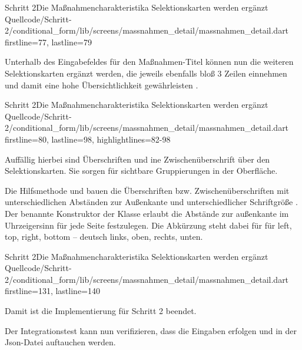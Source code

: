 \begin{alexlisting}{Schritt 2}{Die Maßnahmencharakteristika Selektionskarten werden ergänzt}
  {Quellcode/Schritt-2/conditional_form/lib/screens/massnahmen_detail/massnahmen_detail.dart}
  {firstline=77, lastline=79}
  \label{lst:Schritt2BuildSelectionCardLetzterStatusChoices}
\end{alexlisting}

Unterhalb des Eingabefeldes für den Maßnahmen-Titel können nun die weiteren Selektionskarten ergänzt werden, die jeweils ebenfalls bloß 3 Zeilen einnehmen und damit eine hohe Übersichtlichkeit gewährleisten .

\begin{alexlisting}{Schritt 2}{Die Maßnahmencharakteristika Selektionskarten werden ergänzt}
  {Quellcode/Schritt-2/conditional_form/lib/screens/massnahmen_detail/massnahmen_detail.dart}
  {firstline=80, lastline=98, highlightlines={82-98}}
  \label{lst:Schritt2MassnahmencharakteristikaSelektionskartenWerdenErgaenzt}
\end{alexlisting}

Auffällig hierbei sind Überschriften  und ine Zwischenüberschrift  über den Selektionskarten. Sie sorgen für sichtbare Gruppierungen in der Oberfläche.

Die Hilfsmethode  und  bauen die Überschriften  bzw. Zwischenüberschriften  mit unterschiedlichen Abständen zur Außenkante  und unterschiedlicher Schriftgröße . Der benannte Konstruktor  der Klasse  erlaubt die Abstände zur außenkante im Uhrzeigersinn für jede Seite festzulegen. Die Abkürzung  steht dabei für für left, top, right, bottom -- deutsch links, oben, rechts, unten.

\begin{alexlisting}{Schritt 2}{Die Maßnahmencharakteristika Selektionskarten werden ergänzt}
  {Quellcode/Schritt-2/conditional_form/lib/screens/massnahmen_detail/massnahmen_detail.dart}
  {firstline=131, lastline=140}
  \label{lst:Schritt2buildSectionHeadlineBuildSubSectionHeadline}
\end{alexlisting}

Damit ist die Implementierung für Schritt 2 beendet.

Der Integrationstest kann nun verifizieren, dass die Eingaben erfolgen und in der Json-Datei auftauchen werden.






\ifincludeall \clearpage \fi 
